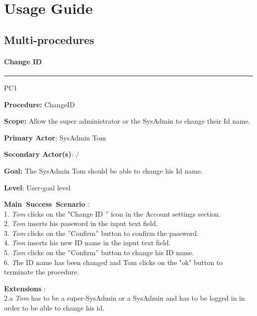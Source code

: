 \chapter{Usage Guide}
\label{chap:usage_guide}


\section{Multi-procedures}


\subsubsection{Change ID}

\hrule
\vspace{0.5cm}
\begin{lyxlist}{PC1}
\small{
\item [\textbf{Procedure:}] ChangeID 
\item [\textbf{Scope:}] Allow the super administrator or the SysAdmin to change
their Id name.
\item [\textbf{Primary Actor}:] SysAdmin Tom
\item [\textbf{Secondary Actor(s)}:] /
\item [\textbf{Goal:}] The SysAdmin Tom should be able to change his Id name.
\item [\textbf{Level}:] User-goal level
\item [\textbf{Main~Success~Scenario}]:\\
1. \emph{Tom} clicks on the "Change ID '' icon in the Account settings
section.\\
2. \emph{Tom} inserts his password in the input text field.\\
3. \emph{Tom} clicks on the ''Confirm'' button to confirm the password.\\
4. \emph{Tom} inserts his new ID name in the input text field.\\
5. \emph{Tom} clicks on the ''Confirm'' button to change his ID name.\\
6. \emph The ID name has been changed and {Tom} clicks on the "ok" button
to terminate the procedure.\\

\item [\textbf{Extensions}]:\\
2.a \emph{Tom} has to be a super-SysAdmin or a SysAdmin and has to be logged
in in order to be able to change his id.\\
}


\end{lyxlist}

